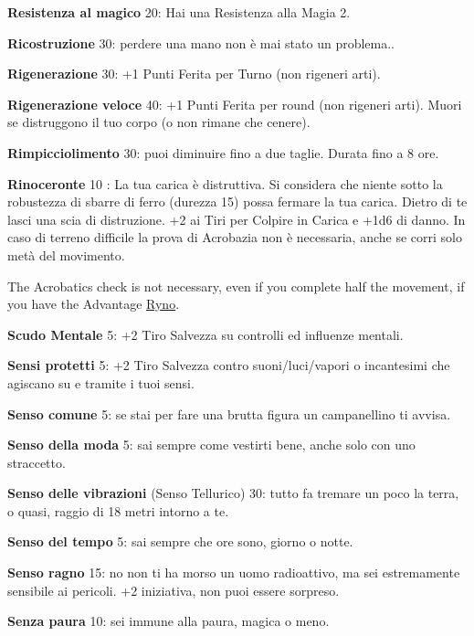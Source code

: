 \documentclass[a4paper,twoside,openany]{book}
\begin{document}
\begin{multicols}{2}
\textbf{Resistenza al magico} 20: Hai una Resistenza alla Magia 2.

\textbf{Ricostruzione} 30: perdere una mano non è mai stato un problema..

\textbf{Rigenerazione} 30: +1 Punti Ferita per Turno (non rigeneri arti).

\textbf{Rigenerazione veloce} 40: +1 Punti Ferita per round (non rigeneri arti). Muori se distruggono il tuo corpo (o non rimane che cenere).

\textbf{Rimpicciolimento} 30: puoi diminuire fino a due taglie. Durata fino a 8 ore.

\hypertarget{rinoceronte}{}\textbf{Rinoceronte} 10 : La tua carica è distruttiva. Si considera che niente sotto la robustezza di sbarre di ferro (durezza 15) possa fermare la tua carica. Dietro di te lasci una scia di distruzione. +2 ai Tiri per Colpire in Carica e +1d6 di danno.
In caso di terreno difficile la prova di Acrobazia non è necessaria, anche se corri solo metà del movimento.

The Acrobatics check is not necessary, even if you complete half the movement, if you have the Advantage \hyperlink{rinoceronte}{Ryno}.


\textbf{Scudo Mentale} 5: +2 Tiro Salvezza su controlli ed influenze mentali.

\textbf{Sensi protetti} 5: +2 Tiro Salvezza contro suoni/luci/vapori o incantesimi che agiscano su e tramite i tuoi sensi.

\textbf{Senso comune} 5: se stai per fare una brutta figura un campanellino ti avvisa.

\textbf{Senso della moda} 5: sai sempre come vestirti bene, anche solo con uno straccetto.

\textbf{Senso delle vibrazioni}   (Senso Tellurico) 30: tutto fa tremare un poco la terra, o quasi, raggio di 18 metri intorno a te.

\textbf{Senso del tempo} 5: sai sempre che ore sono, giorno o notte.

\textbf{Senso ragno} 15: no non ti ha morso un uomo radioattivo, ma sei estremamente sensibile ai pericoli. +2 iniziativa, non puoi essere sorpreso.

\textbf{Senza paura} 10: sei immune alla paura, magica o meno.


\end{multicols}
\end{document}
